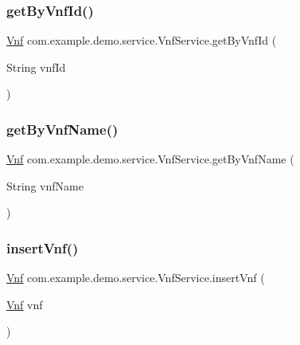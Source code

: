 \subsubsection{\texorpdfstring{get\+By\+Vnf\+Id()}{getByVnfId()}}
{\footnotesize\ttfamily \mbox{\hyperlink{classcom_1_1example_1_1demo_1_1modular_1_1_vnf}{Vnf}} com.\+example.\+demo.\+service.\+Vnf\+Service.\+get\+By\+Vnf\+Id (\begin{DoxyParamCaption}\item[{String}]{vnf\+Id }\end{DoxyParamCaption})}

\mbox{\label{classcom_1_1example_1_1demo_1_1service_1_1_vnf_service_aeccec0d2f363d070a1a7f89c77b2780e}} 
\subsubsection{\texorpdfstring{get\+By\+Vnf\+Name()}{getByVnfName()}}
{\footnotesize\ttfamily \mbox{\hyperlink{classcom_1_1example_1_1demo_1_1modular_1_1_vnf}{Vnf}} com.\+example.\+demo.\+service.\+Vnf\+Service.\+get\+By\+Vnf\+Name (\begin{DoxyParamCaption}\item[{String}]{vnf\+Name }\end{DoxyParamCaption})}

\mbox{\label{classcom_1_1example_1_1demo_1_1service_1_1_vnf_service_a625a4e37d842de6d20e785889d4091bc}} 
\subsubsection{\texorpdfstring{insert\+Vnf()}{insertVnf()}}
{\footnotesize\ttfamily \mbox{\hyperlink{classcom_1_1example_1_1demo_1_1modular_1_1_vnf}{Vnf}} com.\+example.\+demo.\+service.\+Vnf\+Service.\+insert\+Vnf (\begin{DoxyParamCaption}\item[{\mbox{\hyperlink{classcom_1_1example_1_1demo_1_1modular_1_1_vnf}{Vnf}}}]{vnf }\end{DoxyParamCaption})}

